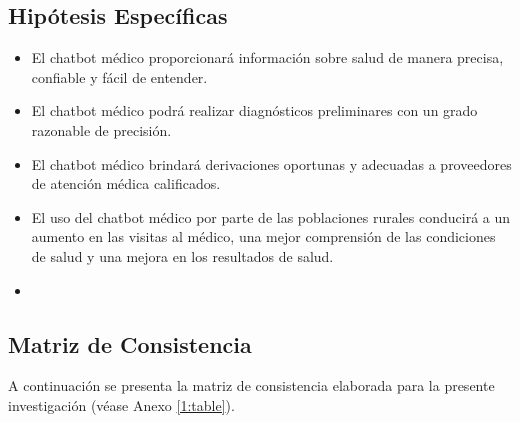\subsection{Hipótesis Específicas}
\newcommand{\Hone}{
El chatbot médico proporcionará información sobre salud de manera precisa, confiable y fácil de entender.
}
\newcommand{\Htwo}{
El chatbot médico podrá realizar diagnósticos preliminares con un grado razonable de precisión.
}
\newcommand{\Hthree}{
El chatbot médico brindará derivaciones oportunas y adecuadas a proveedores de atención médica calificados.
}
\newcommand{\Hfour}{
El uso del chatbot médico por parte de las poblaciones rurales conducirá a un aumento en las visitas al médico, una mejor comprensión de las condiciones de salud y una mejora en los resultados de salud.
}
\newcommand{\Hfive}{

}
\begin{itemize}
	\item \Hone
	\item \Htwo
	\item \Hthree
	\item \Hfour
	\item \Hfive
\end{itemize}

\subsection{Matriz de Consistencia}
A continuación se presenta la matriz de consistencia elaborada para la presente investigación (véase Anexo \ref{1:table}).

